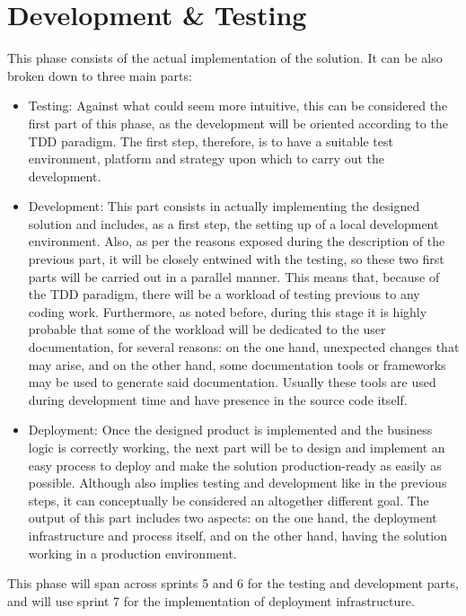 \section{Development \& Testing}
This phase consists of the actual implementation of the solution. It can be also broken down to three main parts:

\begin{itemize}
\item Testing: Against what could seem more intuitive, this can be considered the first part of this phase, as the development will be oriented according to the TDD paradigm. The first step, therefore, is to have a suitable test environment, platform and strategy upon which to carry out the development.

\item Development: This part consists in actually implementing the designed solution and includes, as a first step, the setting up of a local development environment. Also, as per the reasons exposed during the description of the previous part, it will be closely entwined with the testing, so these two first parts will be carried out in a parallel manner. This means that, because of the TDD paradigm, there will be a workload of testing previous to any coding work. Furthermore, as noted before, during this stage it is highly probable that some of the workload will be dedicated to the user documentation, for several reasons: on the one hand, unexpected changes that may arise, and on the other hand, some documentation tools or frameworks may be used to generate said documentation. Usually these tools are used during development time and have presence in the source code itself.

\item Deployment: Once the designed product is implemented and the business logic is correctly working, the next part will be to design and implement an easy process to deploy and make the solution production-ready as easily as possible. Although also implies testing and development like in the previous steps, it can conceptually be considered an altogether different goal. The output of this part includes two aspects: on the one hand, the deployment infrastructure and process itself, and on the other hand, having the solution working in a production environment.
\end{itemize}

This phase will span across sprints 5 and 6 for the testing and development parts, and will use sprint 7 for the implementation of deployment infrastructure.

